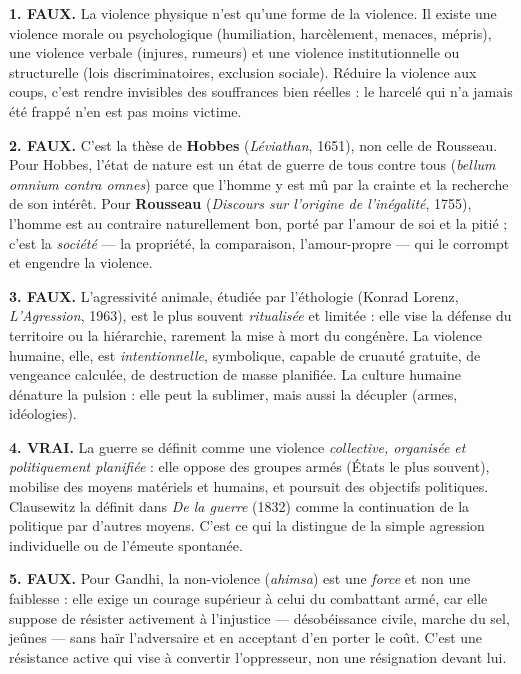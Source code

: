 \documentclass[11pt]{article}
\newcommand{\cle}[1]{{\popxbold\color{popdark}#1}}
\begin{document}
\begin{corrige}

\textbf{1. FAUX.} La violence physique n'est qu'une forme de la violence. Il existe une \cle{violence morale} ou psychologique (humiliation, harcèlement, menaces, mépris), une violence verbale (injures, rumeurs) et une \cle{violence institutionnelle} ou structurelle (lois discriminatoires, exclusion sociale). Réduire la violence aux coups, c'est rendre invisibles des souffrances bien réelles : le harcelé qui n'a jamais été frappé n'en est pas moins victime.

\textbf{2. FAUX.} C'est la thèse de \textbf{Hobbes} (\emph{Léviathan}, 1651), non celle de Rousseau. Pour Hobbes, l'état de nature est un état de guerre de tous contre tous (\emph{bellum omnium contra omnes}) parce que l'homme y est mû par la crainte et la recherche de son intérêt. Pour \textbf{Rousseau} (\emph{Discours sur l'origine de l'inégalité}, 1755), l'homme est au contraire naturellement bon, porté par l'amour de soi et la pitié ; c'est la \emph{société} — la propriété, la comparaison, l'amour-propre — qui le corrompt et engendre la violence.

\textbf{3. FAUX.} L'agressivité animale, étudiée par l'éthologie (Konrad Lorenz, \emph{L'Agression}, 1963), est le plus souvent \emph{ritualisée} et limitée : elle vise la défense du territoire ou la hiérarchie, rarement la mise à mort du congénère. La violence humaine, elle, est \emph{intentionnelle}, symbolique, capable de cruauté gratuite, de vengeance calculée, de destruction de masse planifiée. La culture humaine dénature la pulsion : elle peut la sublimer, mais aussi la décupler (armes, idéologies).

\textbf{4. VRAI.} La \cle{guerre} se définit comme une violence \emph{collective, organisée et politiquement planifiée} : elle oppose des groupes armés (États le plus souvent), mobilise des moyens matériels et humains, et poursuit des objectifs politiques. Clausewitz la définit dans \emph{De la guerre} (1832) comme la continuation de la politique par d'autres moyens. C'est ce qui la distingue de la simple agression individuelle ou de l'émeute spontanée.

\textbf{5. FAUX.} Pour Gandhi, la non-violence (\emph{ahimsa}) est une \emph{force} et non une faiblesse : elle exige un courage supérieur à celui du combattant armé, car elle suppose de résister activement à l'injustice — désobéissance civile, marche du sel, jeûnes — sans haïr l'adversaire et en acceptant d'en porter le coût. C'est une \cle{résistance active} qui vise à convertir l'oppresseur, non une résignation devant lui.

\end{corrige}
\end{document}

